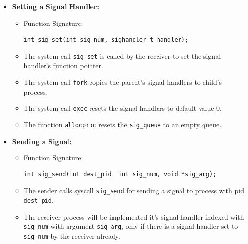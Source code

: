 \documentclass[a4 paper]{article}
\newcommand{\code}[1]{\texttt{#1}}
\begin{document}
\begin{itemize}
\item \textbf{Setting a Signal Handler:}
\begin{itemize}
  \item Function Signature: \begin{lstlisting}
int sig_set(int sig_num, sighandler_t handler);
  \end{lstlisting}
  \item The system call \code{sig\_set} is called by the receiver to set the signal handler's function pointer.
  \item The system call \code{fork} copies the parent's signal handlers to child's process.
  \item The system call \code{exec} resets the signal handlers to default value 0.
  \item The function \code{allocproc} resets the \code{sig\_queue} to an empty queue.
\end{itemize}

\item \textbf{Sending a Signal:}
\begin{itemize}
  \item Function Signature: \begin{lstlisting}
int sig_send(int dest_pid, int sig_num, void *sig_arg);
  \end{lstlisting}
  \item The sender calls syscall \code{sig\_send} for sending a signal to process with pid \code{dest\_pid}.
  \item The receiver process will be implemented it's signal handler indexed with \code{sig\_num} with argument \code{sig\_arg}, only if there is a signal handler set to \code{sig\_num} by the receiver already.
\end{itemize}


\end{itemize}
\end{document}
